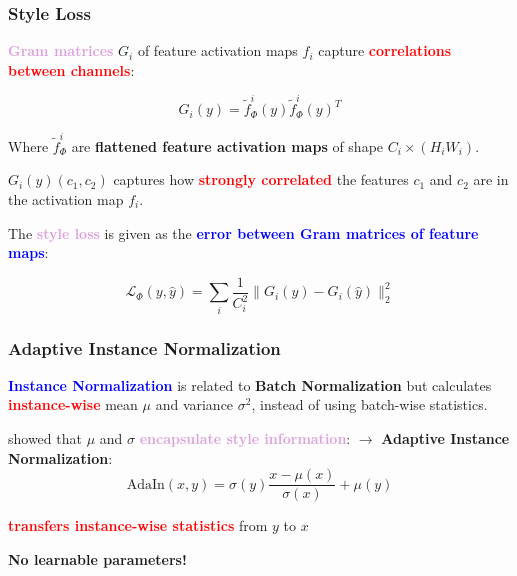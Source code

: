 \documentclass[11pt,xcolor=dvipsnames]{beamer}
\begin{document}
\begin{frame}
	\frametitle{Style Loss}

\textbf{\textcolor{Plum}{Gram matrices}} $G_i$ of feature activation maps  $f_i$ capture \textbf{\textcolor{red}{correlations between channels}}:

\begin{equation*}
	G_i(y) = \tilde{f}_{\Phi}^i(y) \tilde{f}_{\Phi}^i(y)^T
\end{equation*}

Where $\tilde{f}^i_{\Phi}$ are \textbf{flattened feature activation maps} of shape $C_i \times (H_i W_i)$.
\vspace{10pt}

$G_i(y)(c_1, c_2)$ captures how \textcolor{red}{\textbf{strongly correlated}} the features $c_1$ and $c_2$ are in the activation map $f_i$.

\vspace{10pt}	
	
The \textbf{\textcolor{Plum}{style loss}} is given as the \textbf{\textcolor{blue}{error between Gram matrices of feature maps}}:

\begin{equation*}
	\mathcal{L}_{\Phi}(y, \hat{y}) = \sum_i \frac{1}{C_i^2} \lVert G_i(y) - G_i(\hat{y}) \rVert^2_2
\end{equation*}
	
\end{frame}

\begin{frame}
\frametitle{Adaptive Instance Normalization}

\textbf{\textcolor{blue}{Instance Normalization}} is related to \textbf{Batch Normalization} but calculates \textbf{\textcolor{red}{instance-wise}} mean $\mu$ and variance $\sigma^2$, instead of using batch-wise statistics.

\vspace{10pt}

\cite{adain} showed that $\mu$ and $\sigma$ \textbf{\textcolor{Plum}{encapsulate style information}}:
\vspace{10pt}
$\rightarrow$ \textbf{Adaptive Instance Normalization}:
\begin{equation*}
	\text{AdaIn}(x, y) = \sigma(y) \frac{x - \mu(x)}{\sigma(x)} + \mu(y)
\end{equation*}
\vspace{10pt}

\textbf{\textcolor{red}{transfers instance-wise statistics}} from $y$ to $x$

\vspace{10pt}

\textbf{No learnable parameters!}

\end{frame}
\end{document}
